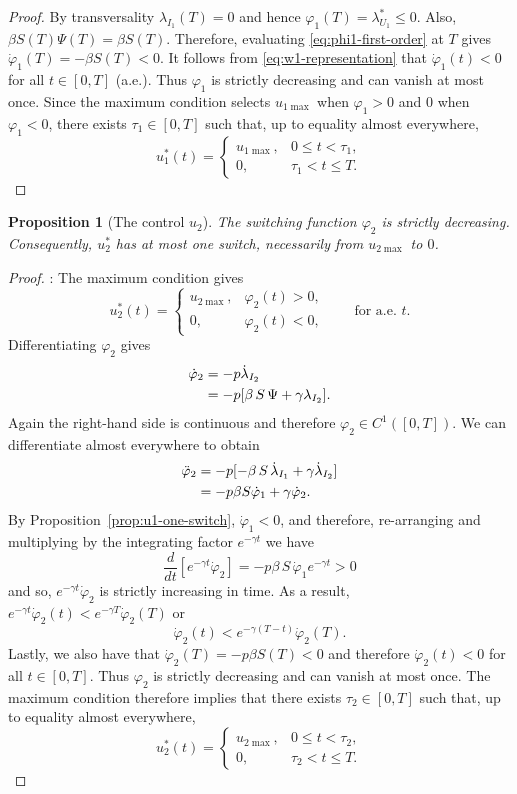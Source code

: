 \documentclass[pdflatex]{sn-jnl}
\newtheorem{proposition}{Proposition}
\theoremstyle{thmstyleone}%
\theoremstyle{thmstyletwo}%
\theoremstyle{thmstylethree}%
\begin{document}
\begin{proof}
By transversality $\lambda_{I_1}(T)=0$ and hence $\varphi_1(T)=\lambda_{U_1}^*\leq 0$. Also, $\beta S(T)\Psi(T)=\beta S(T)$. Therefore, evaluating \eqref{eq:phi1-first-order} at \(T\) gives $\dot \varphi_1(T)=-\beta S(T)<0$. It follows from \eqref{eq:w1-representation} that $\dot\varphi_1(t)<0$ for all $t\in[0,T]$ (a.e.). Thus \(\varphi_1\) is strictly decreasing and can vanish at most once. Since the maximum condition selects \(u_{1\max}\) when
\(\varphi_1>0\) and \(0\) when \(\varphi_1<0\), there exists
\(\tau_1\in[0,T]\) such that, up to equality almost everywhere,
\[
u_1^*(t)
=
\begin{cases}
u_{1\max}, & 0\leq t<\tau_1,\\
0, & \tau_1<t\leq T.
\end{cases}
\]
\end{proof}
%
\begin{proposition}[The control $u_2$]
\label{prop:u2-one-switch}
The switching function \(\varphi_2\) is strictly decreasing. Consequently,
\(u_2^*\) has at most one switch, necessarily from \(u_{2\max}\) to \(0\).
\end{proposition}
%
\begin{proof}:
The maximum condition gives
\[
u_2^*(t)
=
\begin{cases}
u_{2\max}, & \varphi_2(t)>0,\\
0, & \varphi_2(t)<0,
\end{cases}
\qquad\text{for a.e. }t.
\]
Differentiating $\varphi_2$ gives
\begin{align}
\dot\varphi_2
&=
-p\dot\lambda_{I_2}\notag\\
&=
-p[\beta\, S\, \Psi+\gamma \lambda_{I_2}].\notag
\end{align}
Again the right-hand side is continuous and therefore \(\varphi_2\in C^1([0,T])\). We can differentiate almost everywhere to obtain
\begin{align}
\ddot \varphi_2
&=
-p[-\beta\, S\, \dot \lambda_{I_1}+\gamma \dot \lambda_{I_2}]\notag\\
&=
-p \beta S \dot \varphi_1+\gamma \dot \varphi_2.
\end{align}
By Proposition~\ref{prop:u1-one-switch}, $\dot\varphi_1<0$, and therefore, re-arranging and multiplying by the integrating factor $e^{-\gamma t}$ we have 
\[
\frac{d}{dt}[e^{-\gamma t}\dot \varphi_2] =-p\beta\, S\, \dot \varphi_1e^{-\gamma t}>0
\]
and so, $e^{-\gamma t}\dot \varphi_2$ is strictly increasing in time. As a result, $e^{-\gamma t}\dot \varphi_2(t)<e^{-\gamma T}\dot \varphi_2(T)$ or 
\begin{equation}
\dot \varphi_2(t)<e^{-\gamma (T-t)}\dot \varphi_2(T).
\end{equation}
Lastly, we also have that $\dot \varphi_2(T)=-p \beta S(T)<0$ and therefore $\dot \varphi_2(t)<0$ for all $t\in[0,T]$. Thus \(\varphi_2\) is strictly decreasing and can vanish at most once. The maximum condition therefore implies that there exists
\(\tau_2\in[0,T]\) such that, up to equality almost everywhere,
\[
u_2^*(t)
=
\begin{cases}
u_{2\max}, & 0\leq t<\tau_2,\\
0, & \tau_2<t\leq T.
\end{cases}
\]
\end{proof}
%
\end{document}
